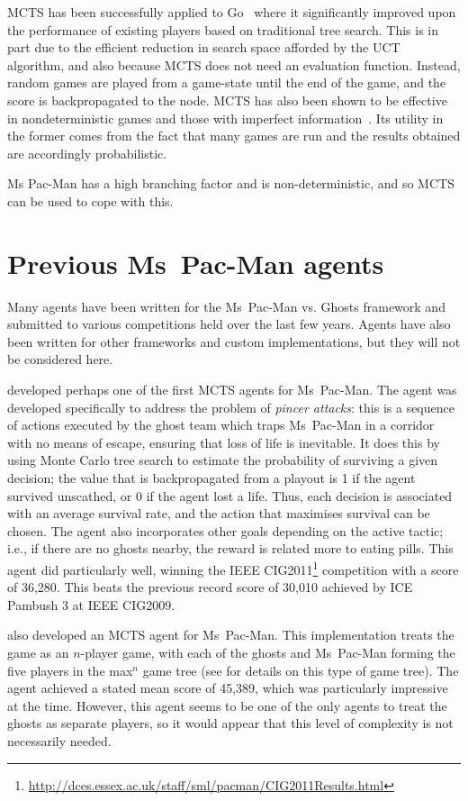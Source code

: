 MCTS has been successfully applied to Go~\citep{Gelly2006} where it significantly improved upon the performance of existing players based on traditional tree search.  This is in part due to the efficient reduction in search space afforded by the UCT algorithm, and also because MCTS does not need an evaluation function.  Instead, random games are played from a game-state until the end of the game, and the score is backpropagated to the node.  MCTS has also been shown to be effective in nondeterministic games and those with imperfect information~\citep{Kocsis2006}.  Its utility in the former comes from the fact that many games are run and the results obtained are accordingly probabilistic.

Ms Pac-Man has a high branching factor and is non-deterministic, and so MCTS can be used to cope with this.

\section{Previous Ms~Pac-Man agents}
\label{sec:previousagents}

Many agents have been written for the Ms~Pac-Man vs. Ghosts framework and submitted to various competitions held over the last few years.  Agents have also been written for other frameworks and custom implementations, but they will not be considered here.

\citet{Ikehata2011} developed perhaps one of the first MCTS agents for Ms~Pac-Man.  The agent was developed specifically to address the problem of \emph{pincer attacks}: this is a sequence of actions executed by the ghost team which traps Ms~Pac-Man in a corridor with no means of escape, ensuring that loss of life is inevitable.  It does this by using Monte Carlo tree search to estimate the probability of surviving a given decision; the value that is backpropagated from a playout is 1 if the agent survived unscathed, or 0 if the agent lost a life.  Thus, each decision is associated with an average survival rate, and the action that maximises survival can be chosen.  The agent also incorporates other goals depending on the active tactic; i.e., if there are no ghosts nearby, the reward is related more to eating pills.  This agent did particularly well, winning the IEEE CIG2011\footnote{\url{http://dces.essex.ac.uk/staff/sml/pacman/CIG2011Results.html}} competition with a score of 36,280.  This beats the previous record score of 30,010 achieved by ICE Pambush 3 at IEEE CIG2009.

\citet{Samothrakis2011} also developed an MCTS agent for Ms~Pac-Man.  This implementation treats the game as an $n$-player game, with each of the ghosts and Ms~Pac-Man forming the five players in the max$^n$ game tree (see \citet{Luckhart1986} for details on this type of game tree).  The agent achieved a stated mean score of 45,389, which was particularly impressive at the time.  However, this agent seems to be one of the only agents to treat the ghosts as separate players, so it would appear that this level of complexity is not necessarily needed.


